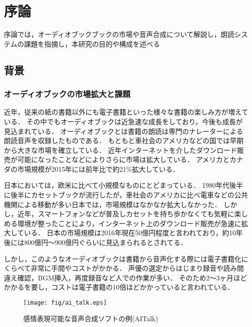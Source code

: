 
\chapter{序論}
序論では，オーディオブックブックの市場や音声合成について解説し，朗読システムの課題を指摘し，本研究の目的や構成を述べる


\section{背景}
\subsection{オーディオブックの市場拡大と課題}
近年，従来の紙の書籍以外にも電子書籍といった様々な書籍の楽しみ方が増えている．
その中でもオーディオブックは近急速な成長をしており，今後も成長が見込まれている．
オーディオブックとは書籍の朗読は専門のナレーターによる朗読音声を収録したものである．
もともと車社会のアメリカなどの国では早期から大きな市場を確立している．
近年インターネットを介したダウンロード販売が可能になったことなどによりさらに市場は拡大している．
アメリカとカナダの市場規模が2015年には前年比で約21\%拡大している\cite{wsj}．

日本においては，欧米に比べて小規模なものにとどまっている．
1980年代後半に後半にカセットブックが流行したが，車社会のアメリカに比べ電車などの公共機関による移動が多い日本では，市場規模はなかなか拡大しなかった．
しかし，近年，スマートフォンなどが普及しカセットを持ち歩かなくても気軽に楽しめる環境が整ったことにより，インターネット上のダウンロード販売が急速に拡大している．
日本の市場規模は2016年現在50億円程度と言われており，約10年後には800億円〜900億円ぐらいに見込まられるとされてる．\cite{cnet}

しかし，このようなオーディオブックは書籍から音声化する際には電子書籍化にくらべて非常に手間やコストがかかる．
声優の選定からはじまり録音や読み間違え確認，BGM挿入，再度録音など人での作業が多い．
そのため2〜3ヶ月ほどかかるを要し，コストは電子書籍の10倍ほどかかっていると言われている．\cite{ueda}

\begin{figure}[ht]
  \begin{center}
    \texttt{[image: fig/ai\_talk.eps]}
    \caption{感情表現可能な音声合成ソフトの例(AITalk)}
    \label{fig:ai_talk}
  \end{center}
\end{figure}

